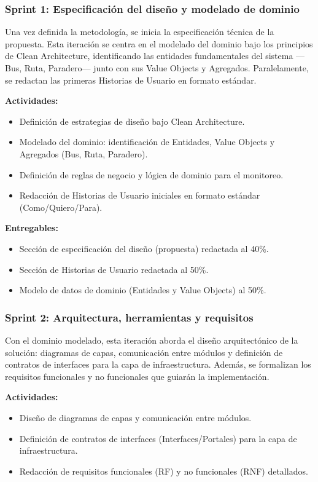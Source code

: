 \subsubsection{Sprint 1: Especificación del diseño y modelado de dominio}

Una vez definida la metodología, se inicia la especificación técnica de la propuesta. Esta iteración se centra en el modelado del dominio bajo los principios de Clean Architecture, identificando las entidades fundamentales del sistema ---Bus, Ruta, Paradero--- junto con sus Value Objects y Agregados. Paralelamente, se redactan las primeras Historias de Usuario en formato estándar.

\textbf{Actividades:}
\begin{itemize}
    \item Definición de estrategias de diseño bajo Clean Architecture.
    \item Modelado del dominio: identificación de Entidades, Value Objects y Agregados (Bus, Ruta, Paradero).
    \item Definición de reglas de negocio y lógica de dominio para el monitoreo.
    \item Redacción de Historias de Usuario iniciales en formato estándar (Como/Quiero/Para).
\end{itemize}

\textbf{Entregables:}
\begin{itemize}
    \item Sección de especificación del diseño (propuesta) redactada al 40\%.
    \item Sección de Historias de Usuario redactada al 50\%.
    \item Modelo de datos de dominio (Entidades y Value Objects) al 50\%.
\end{itemize}

\subsubsection{Sprint 2: Arquitectura, herramientas y requisitos}

Con el dominio modelado, esta iteración aborda el diseño arquitectónico de la solución: diagramas de capas, comunicación entre módulos y definición de contratos de interfaces para la capa de infraestructura. Además, se formalizan los requisitos funcionales y no funcionales que guiarán la implementación.

\textbf{Actividades:}
\begin{itemize}
    \item Diseño de diagramas de capas y comunicación entre módulos.
    \item Definición de contratos de interfaces (Interfaces/Portales) para la capa de infraestructura.
    \item Redacción de requisitos funcionales (RF) y no funcionales (RNF) detallados.
\end{itemize}

